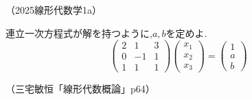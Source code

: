 \begin{flushright}
    （2025線形代数学1a）
\end{flushright}
連立一次方程式が解を持つように,$a,b$を定めよ.\\
\[\begin{pmatrix}
    2 & 1 & 3 \\
    0 & -1 & 1 \\
    1 & 1 & 1
\end{pmatrix}
\begin{pmatrix}
    x_1 \\ x_2 \\ x_3
\end{pmatrix}=
\begin{pmatrix}
    1 \\ a \\ b
\end{pmatrix}\]
\begin{flushright}
    （三宅敏恒「線形代数概論」p64）
\end{flushright}
